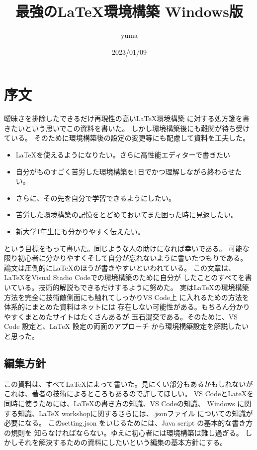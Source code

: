\documentclass{ltjsarticle}
\begin{document}
\title{最強の\LaTeX 環境構築 Windows版}
\author{yuma}
\date{2023/01/09}
\maketitle
\section{序文}
曖昧さを排除したできるだけ再現性の高い\LaTeX 環境構築
に対する処方箋を書きたいという思いでこの資料を書いた。
しかし環境構築後にも難関が待ち受けている。
そのために環境構築後の設定の変更等にも配慮して資料を工夫した。
\begin{itemize}
  \item \LaTeX を使えるようになりたい。さらに高性能エディターで書きたい
  \item 自分がものすごく苦労した環境構築を1日でかつ理解しながら終わらせたい。
  \item さらに、その先を自分で学習できるようにしたい。
  \item 苦労した環境構築の記憶をとどめておいてまた困った時に見返したい。
  \item 新大学1年生にも分かりやすく伝えたい。
\end{itemize}
という目標をもって書いた。同じような人の助けになれば幸いである。
可能な限り初心者に分かりやすくそして自分が忘れないように書いたつもりである。
論文は圧倒的に\LaTeX のほうが書きやすいといわれている。
この文章は、\LaTeX をVisual Stadio Codeでの環境構築のために自分が
したことのすべてを書いている。技術的解説もできるだけするように努めた。
実は\LaTeX の環境構築方法を完全に技術敵側面にも触れてしっかりVS Code上
に入れるための方法を体系的にまとめた資料はネットには
存在しない可能性がある。もちろん分かりやすくまとめたサイトはたくさんあるが
玉石混交である。そのために、VS Code 設定と、LaTeX 設定の両面のアプローチ
から環境構築設定を解説したいと思った。


\subsection{編集方針}

この資料は、すべて\LaTeX によって書いた。見にくい部分もあるかもしれないが
これは、著者の技術によるところもあるので許してほしい。
VS CodeとLateXを同時に使うためには、LaTeXの書き方の知識、VS Codeの知識、
Windows に関する知識、LaTeX workshopに関するさらには、.jsonファイル
についての知識が必要になる。
このsetting.json をいじるためには、Java script の基本的な書き方の規則を
知らなければならない。ゆえに初心者には環境構築は難し過ぎる。
しかしそれを解決するための資料にしたいという編集の基本方針にする。
\end{document}
